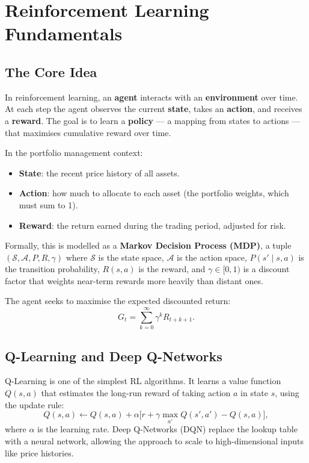 \documentclass[12pt,a4paper]{article}
\begin{document}
\section{Reinforcement Learning Fundamentals}
\label{sec:rl}

\subsection{The Core Idea}

In reinforcement learning, an \textbf{agent} interacts with an
\textbf{environment} over time. At each step the agent observes the
current \textbf{state}, takes an \textbf{action}, and receives a
\textbf{reward}. The goal is to learn a \textbf{policy} --- a mapping
from states to actions --- that maximises cumulative reward over time.

In the portfolio management context:
\begin{itemize}[nosep]
  \item \textbf{State}: the recent price history of all assets.
  \item \textbf{Action}: how much to allocate to each asset (the
        portfolio weights, which must sum to 1).
  \item \textbf{Reward}: the return earned during the trading period,
        adjusted for risk.
\end{itemize}

Formally, this is modelled as a \textbf{Markov Decision Process (MDP)},
a tuple $(\mathcal{S}, \mathcal{A}, P, R, \gamma)$ where $\mathcal{S}$
is the state space, $\mathcal{A}$ is the action space,
$P(s' \mid s, a)$ is the transition probability, $R(s,a)$ is the
reward, and $\gamma \in [0,1)$ is a discount factor that weights
near-term rewards more heavily than distant ones.

The agent seeks to maximise the expected discounted return:
\begin{equation}
  G_t = \sum_{k=0}^{\infty} \gamma^k R_{t+k+1}.
\end{equation}

\subsection{Q-Learning and Deep Q-Networks}

Q-Learning \citep{watkins1992q} is one of the simplest RL algorithms.
It learns a value function $Q(s,a)$ that estimates the long-run reward
of taking action $a$ in state $s$, using the update rule:
\begin{equation}
  Q(s,a) \leftarrow Q(s,a) + \alpha\bigl[
    r + \gamma \max_{a'} Q(s',a') - Q(s,a)
  \bigr],
\end{equation}
where $\alpha$ is the learning rate. Deep Q-Networks (DQN) replace the
lookup table with a neural network, allowing the approach to scale to
high-dimensional inputs like price histories.
\end{document}
